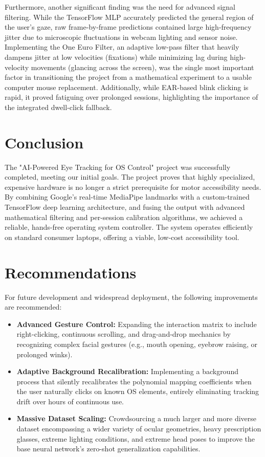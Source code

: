 \documentclass[12pt,a4paper]{report}
\begin{document}
Furthermore, another significant finding was the need for advanced signal filtering. While the TensorFlow MLP accurately predicted the general region of the user's gaze, raw frame-by-frame predictions contained large high-frequency jitter due to microscopic fluctuations in webcam lighting and sensor noise. Implementing the One Euro Filter, an adaptive low-pass filter that heavily dampens jitter at low velocities (fixations) while minimizing lag during high-velocity movements (glancing across the screen), was the single most important factor in transitioning the project from a mathematical experiment to a usable computer mouse replacement. Additionally, while EAR-based blink clicking is rapid, it proved fatiguing over prolonged sessions, highlighting the importance of the integrated dwell-click fallback.

\section{Conclusion}
The "AI-Powered Eye Tracking for OS Control" project was successfully completed, meeting our initial goals. The project proves that highly specialized, expensive hardware is no longer a strict prerequisite for motor accessibility needs. By combining Google's real-time MediaPipe landmarks with a custom-trained TensorFlow deep learning architecture, and fusing the output with advanced mathematical filtering and per-session calibration algorithms, we achieved a reliable, hands-free operating system controller. The system operates efficiently on standard consumer laptops, offering a viable, low-cost accessibility tool.

\section{Recommendations}
For future development and widespread deployment, the following improvements are recommended:
\begin{itemize}
    \item \textbf{Advanced Gesture Control:} Expanding the interaction matrix to include right-clicking, continuous scrolling, and drag-and-drop mechanics by recognizing complex facial gestures (e.g., mouth opening, eyebrow raising, or prolonged winks).
    \item \textbf{Adaptive Background Recalibration:} Implementing a background process that silently recalibrates the polynomial mapping coefficients when the user naturally clicks on known OS elements, entirely eliminating tracking drift over hours of continuous use.
    \item \textbf{Massive Dataset Scaling:} Crowdsourcing a much larger and more diverse dataset encompassing a wider variety of ocular geometries, heavy prescription glasses, extreme lighting conditions, and extreme head poses to improve the base neural network's zero-shot generalization capabilities.
\end{itemize}
\end{document}
